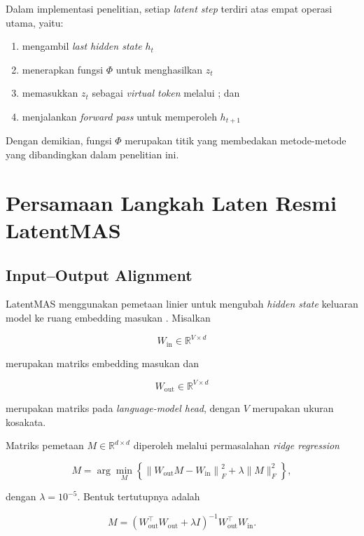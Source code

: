 Dalam implementasi penelitian, setiap \textit{latent step} terdiri atas empat operasi utama, yaitu:

\begin{enumerate}
    \item mengambil \textit{last hidden state} \(h_t\)
    \item menerapkan fungsi \(\Phi\) untuk menghasilkan \(z_t\)
    \item memasukkan \(z_t\) sebagai \textit{virtual token} melalui ; dan
    \item menjalankan \textit{forward pass} untuk memperoleh \(h_{t+1}\)
\end{enumerate}

Dengan demikian, fungsi \(\Phi\) merupakan titik yang membedakan metode-metode yang dibandingkan dalam penelitian ini.

\section{Persamaan Langkah Laten Resmi LatentMAS}

\subsection{Input–Output Alignment}

LatentMAS menggunakan pemetaan linier untuk mengubah \textit{hidden state} keluaran model ke ruang embedding masukan \citep{latentmas}. Misalkan

\[
W_{\mathrm{in}}\in\mathbb{R}^{V\times d}
\]

merupakan matriks embedding masukan dan

\[
W_{\mathrm{out}}\in\mathbb{R}^{V\times d}
\]

merupakan matriks pada \textit{language-model head}, dengan \(V\) merupakan ukuran kosakata.

Matriks pemetaan \(M\in\mathbb{R}^{d\times d}\) diperoleh melalui permasalahan \textit{ridge regression}

\begin{equation}
M
=
\arg\min_M
\left\{
\left\|
W_{\mathrm{out}}M-W_{\mathrm{in}}
\right\|_F^2
+
\lambda\|M\|_F^2
\right\},
\end{equation}

dengan \(\lambda=10^{-5}\). Bentuk tertutupnya adalah

\begin{equation}
M=
\left(
W_{\mathrm{out}}^\top W_{\mathrm{out}}
+
\lambda I
\right)^{-1}
W_{\mathrm{out}}^\top W_{\mathrm{in}}.
\end{equation}

